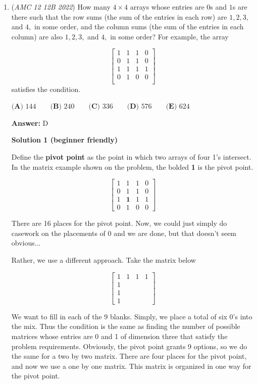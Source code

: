 \begin{enumerate}
 


	\item (\textit{AMC 12 12B 2022}) How many $4 \times 4$ arrays whose entries are $0$s and $1$s are there such that the row sums (the sum of the entries in each row) are $1, 2, 3,$ and $4,$ in some order, and the column sums (the sum of the entries in each column) are also $1, 2, 3,$ and $4,$ in some order? For example, the array

 \[\left[   \begin{array}{cccc}     1 & 1 & 1 & 0 \\     0 & 1 & 1 & 0 \\     1 & 1 & 1 & 1 \\     0 & 1 & 0 & 0 \\   \end{array} \right]\]
satisfies the condition.


 $\textbf{(A) }144 \qquad \textbf{(B) }240 \qquad \textbf{(C) }336 \qquad \textbf{(D) }576 \qquad \textbf{(E) }624$

 \textbf{Answer: }D



\textbf{Solution 1 (beginner friendly)}

Define the \textbf{pivot point} as the point in which two arrays of four 1's intersect. In the matrix example shown on the problem, the bolded \textbf{1} is the pivot point.

 
 \[\begin{bmatrix} 1 & 1 & 1 & 0\\ 0 & 1 & 1 & 0\\ 1 & \mathbf{1} & 1 & 1\\ 0 & 1 & 0 & 0 \end{bmatrix}\]

 There are 16 places for the pivot point. Now, we could just simply do casework on the placements of 0 and we are done, but that doesn't seem obvious...

 Rather, we use a different approach. Take the matrix below

 
 \[\begin{bmatrix} 1 & 1 & 1 & 1\\ 1 &  &  & \\ 1 &  &  & \\ 1 &  &  &  \end{bmatrix}\]

 We want to fill in each of the 9 blanks. Simply, we place a total of six 0's into the mix. Thus the condition is the same as finding the number of possible matrices whose entries are 0 and 1 of dimension three that satisfy the problem requirements. Obviously, the pivot point grants 9 options, so we do the same for a two by two matrix. There are four places for the pivot point, and now we use a one by one matrix. This matrix is organized in one way for the pivot point.


\end{enumerate}
